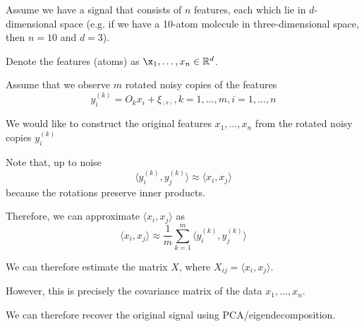 \documentclass[12pt]{article}
\begin{document}
Assume we have a signal that consists of $n$ features, each which lie in $d$-dimensional space (e.g. if we have a 10-atom molecule in three-dimensional space, then $n=10$ and $d=3$).

Denote the features (atoms) as $\x_1, \dots, x_n \in \mathbb{R}^d$. 

Assume that we observe $m$ rotated noisy copies of the features
$$y_i^{(k)} = O_k x_i + \xi_^{(k)}, k=1, \dots, m, i=1, \dots, n$$

We would like to construct the original features $x_1, \dots, x_n$ from the rotated noisy copies $y_i^{(k)}$

Note that, up to noise
$$ \langle y_i^{(k)}, y_j^{(k)} \rangle  \approx \langle x_i, x_j \rangle $$
because the rotations preserve inner products.

Therefore,  we can approximate $\langle x_i, x_j \rangle$ as 
$$ \langle x_i, x_j \rangle  \approx \frac{1}{m} \sum_{k=1}^m \langle y_i^{(k)}, y_j^{(k)} \rangle $$

We can therefore estimate the matrix $X$, where $X_{ij} = \langle x_i, x_j \rangle$.

However, this is precisely the covariance matrix of the data $x_1, \dots, x_n$. 

We can therefore recover the original signal using PCA/eigendecomposition. 
\end{document}
